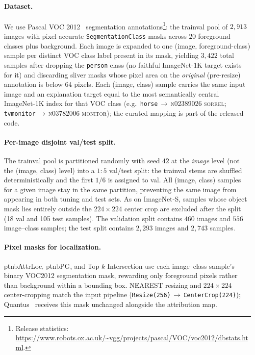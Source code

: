 \paragraph{Dataset.}
We use Pascal VOC 2012~\parencite{Everingham2010voc} segmentation annotations\footnote{Release statistics: \url{https://www.robots.ox.ac.uk/~vgg/projects/pascal/VOC/voc2012/dbstats.html}.}: the trainval pool of
$2{,}913$ images with pixel-accurate \texttt{Seg\-mentationClass} masks across $20$ foreground
classes plus background. Each image is expanded to one (image, foreground-class) sample per
distinct VOC class label present in its mask, yielding $3{,}422$ total samples after dropping the
\texttt{person} class (no faithful ImageNet-1K target exists for it) and discarding sliver masks
whose pixel area on the \emph{original} (pre-resize) annotation is below $64$ pixels. Each (image,
class) sample carries the same input image and an explanation target equal to the most semantically
central ImageNet-1K index for that VOC class (e.g.\ \texttt{horse}$\,\to\,$\textsc{n02389026
sorrel}; \texttt{tvmonitor}$\,\to\,$\textsc{n03782006 monitor}); the curated mapping is part of the
released code.

\paragraph{Per-image disjoint val/test split.} The trainval pool is partitioned randomly with seed $42$ at the \emph{image} level (not the (image,
class) level) into a $1{:}5$ val/test split: the trainval stems are shuffled deterministically and
the first $1/6$ is assigned to val. All (image, class) samples for a given image stay in the same
partition, preventing the same image from appearing in both tuning and test sets. As on
ImageNet-S, samples whose object mask lies entirely outside the $224{\times}224$ center crop are
excluded after the split (18 val and 105 test samples). The validation split contains $460$ images and $556$ image--class samples; the test split contains $2{,}293$ images and $2{,}743$ samples.

\paragraph{Pixel masks for localization.} \ac{ptnbAttrLoc}, \ac{ptnbPG}, and Top-$k$ Intersection use each image--class sample's binary VOC2012 segmentation mask, rewarding only foreground pixels rather than background within a bounding box. NEAREST resizing and $224{\times}224$ center-cropping match the input pipeline (\texttt{Resize(256)$\,\to\,$CenterCrop(224)}); Quantus~\parencite{Hedstrom2023} receives this mask unchanged alongside the attribution map.

